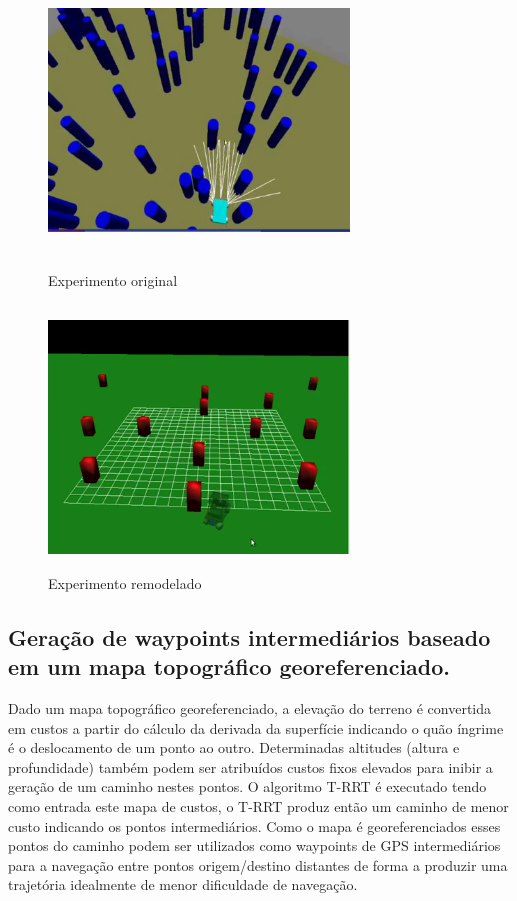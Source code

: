 \documentclass{article}
\begin{document}
\begin{figure}[ht]
	\begin{minipage}[b]{0.4\linewidth}
	    \centering
	    \includegraphics[width=8cm,height=7cm,]{../images/robo_orig.png}
	 	\caption{Experimento original}
	 	\label{fig:robo_orig}
	\end{minipage}
	\hspace{1cm}
	\begin{minipage}[b]{0.4\linewidth}
	    \centering
	    \includegraphics[width=8cm,height=7cm,]{../images/robo_gaz.png}
	 	\caption{Experimento remodelado}
	 	\label{fig:robo_gaz}
	\end{minipage}
\end{figure}


\subsection{Geração de waypoints intermediários baseado em um mapa topográfico
georeferenciado.}

Dado um mapa topográfico georeferenciado, a elevação do terreno é convertida em
custos a partir do cálculo da derivada da superfície indicando o quão íngrime é
o deslocamento de um ponto ao outro. Determinadas altitudes (altura e
profundidade) também podem ser atribuídos custos fixos elevados para inibir a
geração de um caminho nestes pontos. O algoritmo T-RRT é executado tendo como
entrada este mapa de custos, o T-RRT produz então um caminho de menor custo
indicando os pontos intermediários. Como o mapa é georeferenciados esses pontos
do caminho podem ser utilizados como waypoints de GPS intermediários para a
navegação entre pontos origem/destino distantes de forma a produzir uma
trajetória idealmente de menor dificuldade de navegação.
\end{document}
